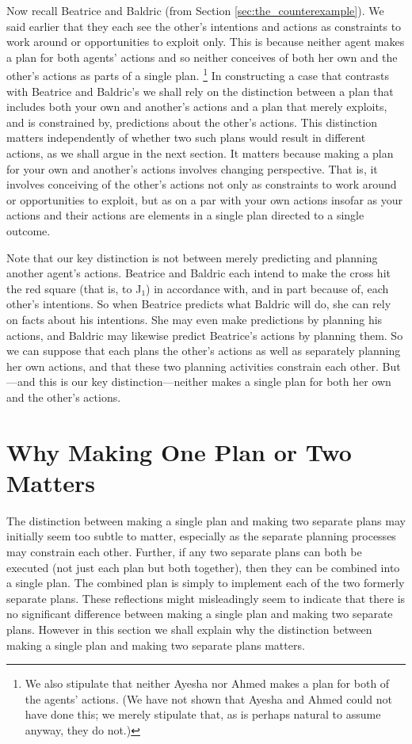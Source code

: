 \documentclass[12pt,\papersize]{extarticle}
\begin{document}
Now recall Beatrice and Baldric (from Section \vref{sec:the_counterexample}).
We said earlier that  they each see the other's intentions and actions  as constraints to work around or opportunities to exploit only.
This is because neither agent makes a plan for both agents' actions and so neither conceives of both her own and the other's actions as parts of a single plan.%
\footnote{
We also stipulate that neither Ayesha nor Ahmed makes a plan for both of the agents' actions.
(We have not shown that Ayesha and Ahmed could not have done this; we merely stipulate that, as is perhaps natural to assume anyway, they do not.)
}
In constructing a case that contrasts with Beatrice and Baldric's we shall rely on the distinction between
a plan that includes both your own and another's actions
and 
a plan that merely exploits, and is constrained by, predictions about the other's actions.
This distinction matters independently of whether two such plans would result in different actions, as we shall argue in the next section.
It matters because 
making a plan for your own and another's actions 
	involves changing perspective.
That is, it involves conceiving of the other's actions not only as constraints to work around or opportunities to exploit, but as on a par with your own actions insofar as your actions and their actions are elements in a single plan directed to a single outcome.

Note that our key distinction is not between merely predicting and planning another agent's actions.
Beatrice and Baldric each intend to make the cross hit the red square (that is, to J${_1}$) in accordance with, and in part because of, each other's intentions.
So when Beatrice predicts what Baldric will do, she can rely on facts about his intentions.
She may even make predictions by planning his actions,
and Baldric may likewise predict Beatrice's actions by planning them.
So we can suppose that each plans the other's actions as well as separately planning her own actions,
and that these two planning activities constrain each other.
But---and this is our key distinction---neither makes a single plan for both her own and the other's actions.



\section{Why Making One Plan or Two Matters}
The distinction between making a single plan and making two separate plans may initially seem too subtle to matter, 
especially as 
the separate planning processes may constrain each other.
Further, if any two separate plans can both be executed (not just each plan but both together), then they can be combined into a single plan.
The combined plan is simply to implement each of the two formerly separate plans. 
These reflections might misleadingly seem to 
indicate that there is no significant difference between making a single plan and making two separate plans.
However in this section we shall explain why the distinction between making a single plan and making two separate plans matters.
\end{document}

